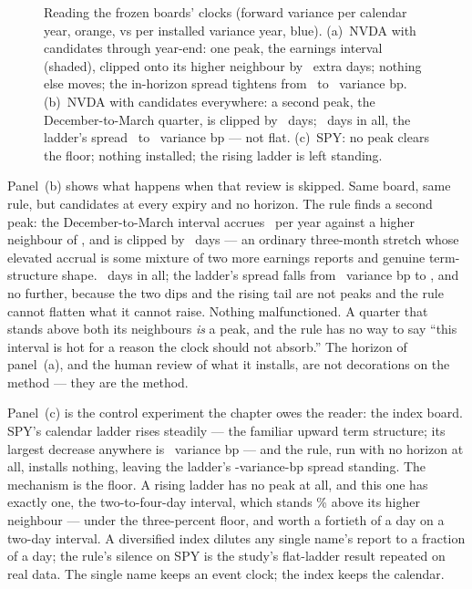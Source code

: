 \begin{figure}[htbp]
\centering
{}
\caption{Reading the frozen boards' clocks (forward variance per
calendar year, orange, vs per installed variance year, blue).
(a)~NVDA with candidates through year-end: one peak, the earnings
interval (shaded), clipped onto its higher neighbour by
\MacClkReadHeroEarnD\ extra days; nothing else moves; the
in-horizon spread tightens from \MacClkReadHeroSpreadBeforeBp\ to
\MacClkReadHeroSpreadAfterBp\ variance bp.  (b)~NVDA with candidates
everywhere: a second peak, the December-to-March quarter, is clipped
by \MacClkReadFullMarchD\ days; \MacClkReadFullTotalD\ days in all,
the ladder's spread \MacClkReadFullSpreadBeforeBp\ to
\MacClkReadFullSpreadAfterBp\ variance bp --- not flat.
(c)~SPY: no peak clears the floor; nothing installed; the rising
ladder is left standing.}
\label{fig:clkread}
\end{figure}

Panel~(b) shows what happens when that review is skipped.  Same
board, same rule, but candidates at every expiry and no horizon.
The rule finds a second peak: the December-to-March interval accrues
\MacClkReadFullMarchBefore\ per year against a higher neighbour of
\MacClkReadFullMarchAfter, and is clipped by \MacClkReadFullMarchD\
days --- an ordinary three-month stretch whose elevated accrual is
some mixture of two more earnings reports and genuine term-structure
shape.  \MacClkReadFullTotalD\ days in all; the ladder's spread
falls from \MacClkReadFullSpreadBeforeBp\ variance bp to
\MacClkReadFullSpreadAfterBp, and no further, because the two dips
and the rising tail are not peaks and the rule cannot flatten what
it cannot raise.  Nothing malfunctioned.  A quarter that stands
above both its neighbours \emph{is} a peak, and the rule has no way
to say ``this interval is hot for a reason the clock should not
absorb.''  The horizon of panel~(a), and the human review of what it
installs, are not decorations on the method --- they are the method.

Panel~(c) is the control experiment the chapter owes the reader:
the index board.  SPY's calendar ladder rises steadily --- the
familiar upward term structure; its largest decrease anywhere is
\MacClkReadSpyDecBp\ variance bp --- and the rule, run with no
horizon at all, installs nothing, leaving
the ladder's \MacClkReadSpySpreadBp-variance-bp spread standing.
The mechanism is the floor.  A rising ladder has no peak at all,
and this one has exactly one, the two-to-four-day interval, which
stands \MacClkReadSpyPeakExcessPct\% above its higher neighbour ---
under the three-percent floor, and worth a fortieth of a day on a
two-day interval.  A diversified index dilutes any
single name's report to a fraction of a day; the rule's silence on
SPY is the study's flat-ladder result repeated on real data.  The
single name keeps an event clock; the index keeps the calendar.

